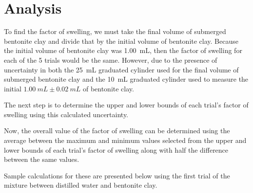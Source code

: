 \documentclass[11pt, letterpaper]{article}
\begin{document}
\section{Analysis}

To find the factor of swelling, we must take the final volume of submerged
bentonite clay and divide that by the initial volume of bentonite clay.
Because the initial volume of bentonite clay was \SI{1.00}{mL}, then
the factor of swelling for each of the 5 trials would be the same.
However, due to the presence of uncertainty in both the \SI{25}{mL}
graduated cylinder used for the final volume of submerged bentonite clay
and the \SI{10}{mL} graduated cylinder used to measure the initial
\(\SI{1.00}{mL} \pm \SI{0.02}{mL}\) of bentonite clay.

The next step is to determine the upper and lower bounds of each trial's factor of swelling
using this calculated uncertainty.

Now, the overall value of the factor of swelling can be determined
using the average between the maximum and minimum values selected
from the upper and lower bounds of each trial's factor of swelling
along with half the difference between the same values.

Sample calculations for these are presented below
using the first trial
of the mixture between distilled water and bentonite clay.
\end{document}
